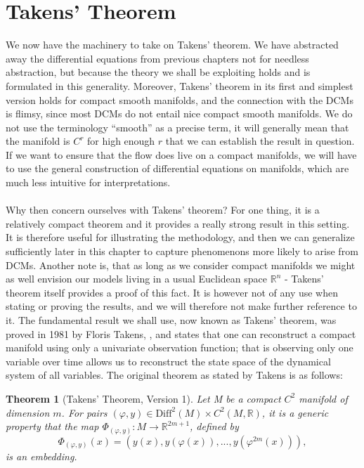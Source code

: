 \documentclass[11pt, a4paper]{memoir}
\theoremstyle{break}
\newtheorem{thm}{Theorem}
\theoremstyle{break}
\theoremstyle{nonumberplain}
\newcommand{\mR}{\mathbb{R}}
\begin{document}
\section{Takens' Theorem}
We now have the machinery to take on Takens' theorem. We have abstracted away the differential equations from previous chapters not for needless abstraction, but because the theory we shall be exploiting holds and is formulated in this generality. Moreover, Takens' theorem in its first and simplest version holds for compact smooth manifolds, and the connection with the DCMs is flimsy, since most DCMs do not entail nice compact smooth manifolds. We do not use the terminology \enquote{smooth} as a precise term, it will generally mean that the manifold is $C^r$ for high enough $r$ that we can establish the result in question. If we want to ensure that the flow does live on a compact manifolds, we will have to use the general construction of differential equations on manifolds, which are much less intuitive for interpretations.\\\\
Why then concern ourselves with Takens' theorem? For one thing, it is a relatively compact theorem and it provides a really strong result in this setting. It is therefore useful for illustrating the methodology, and then we can generalize sufficiently later in this chapter to capture phenomenons more likely to arise from DCMs. Another note is, that as long as we consider compact manifolds we might as well envision our models living in a usual Euclidean space $\mR^n$ - Takens' theorem itself provides a proof of this fact. It is however not of any use when stating or proving the results, and we will therefore not make further reference to it. The fundamental result we shall use, now known as Takens' theorem, was proved in 1981 by Floris Takens, \cite{Takens}, and states that one can reconstruct a compact manifold using only a univariate observation function; that is observing only one variable over time allows us to reconstruct the state space of the dynamical system of all variables. The original theorem as stated by Takens is as follows:
\begin{thm}[Takens' Theorem, Version 1]
Let M be a compact $C^2$ manifold of dimension $m$. For pairs $(\varphi,y)\in \text{Diff}^2(M)\times C^2(M,\mathbb{R})$, it is a generic property that the map $\Phi_{(\varphi,y)}:M\to \mathbb{R}^{2m+1}$, defined by
$$\Phi_{(\varphi,y)}(x)=(y(x),y(\varphi(x)),...,y(\varphi^{2m}(x))),$$
is an embedding. \cite{Takens}
\end{thm}
\end{document}
